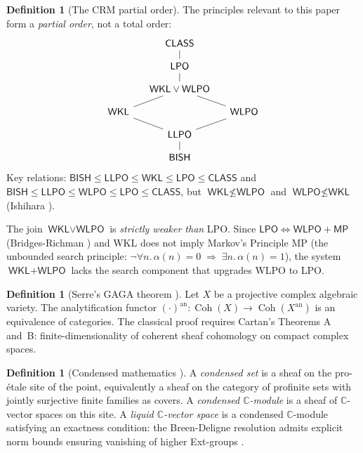 \documentclass[11pt,a4paper]{article}
\theoremstyle{plain}
\theoremstyle{definition}
\newtheorem{definition}[theorem]{Definition}
\newcommand{\BISH}{\textsf{BISH}}
\newcommand{\WKL}{\textsf{WKL}}
\newcommand{\WLPO}{\textsf{WLPO}}
\newcommand{\LLPO}{\textsf{LLPO}}
\newcommand{\LPO}{\textsf{LPO}}
\newcommand{\MP}{\textsf{MP}}
\newcommand{\CLASS}{\textsf{CLASS}}
\newcommand{\C}{\mathbb{C}}
\DeclareMathOperator{\Coh}{Coh}
\begin{document}
\begin{definition}[The CRM partial order]\label{def:partial-order}
The principles relevant to this paper form a \emph{partial order}, not a total order:
\[
\begin{tikzcd}[row sep=small, column sep=small]
  & \CLASS \arrow[d, dash] & \\
  & \LPO \arrow[d, dash] & \\
  & \WKL \vee \WLPO \arrow[dl, dash] \arrow[dr, dash] & \\
  \WKL \arrow[dr, dash] & & \WLPO \arrow[dl, dash] \\
  & \LLPO \arrow[d, dash] & \\
  & \BISH &
\end{tikzcd}
\]
Key relations: $\BISH \le \LLPO \le \WKL \le \LPO \le \CLASS$ and $\BISH \le \LLPO \le \WLPO \le \LPO \le \CLASS$, but $\WKL \nleq \WLPO$ and $\WLPO \nleq \WKL$ (Ishihara \cite{Ishihara2006}).

The join $\WKL \vee \WLPO$ is \emph{strictly weaker than} \LPO.
Since $\LPO \Leftrightarrow \WLPO + \MP$ (Bridges-Richman \cite{BridgesRichman1987}) and \WKL{} does not imply Markov's Principle \MP{} (the unbounded search principle: $\lnot\forall n.\,\alpha(n) = 0 \;\Rightarrow\; \exists n.\,\alpha(n) = 1$), the system $\WKL + \WLPO$ lacks the search component that upgrades \WLPO{} to \LPO.
\end{definition}

\begin{definition}[Serre's GAGA theorem {\cite{Serre1956}}]\label{def:gaga}
Let $X$ be a projective complex algebraic variety.
The analytification functor $(\cdot)^{\mathrm{an}} : \Coh(X) \to \Coh(X^{\mathrm{an}})$ is an equivalence of categories.
The classical proof requires Cartan's Theorems A and~B: finite-dimensionality of coherent sheaf cohomology on compact complex spaces.
\end{definition}

\begin{definition}[Condensed mathematics {\cite{ClausenScholze2020}}]\label{def:condensed}
A \emph{condensed set} is a sheaf on the pro-étale site of the point, equivalently a sheaf on the category of profinite sets with jointly surjective finite families as covers.
A \emph{condensed $\C$-module} is a sheaf of $\C$-vector spaces on this site.
A \emph{liquid $\C$-vector space} is a condensed $\C$-module satisfying an exactness condition: the Breen-Deligne resolution admits explicit norm bounds ensuring vanishing of higher Ext-groups \cite{ClausenScholze2022}.
\end{definition}
\end{document}
